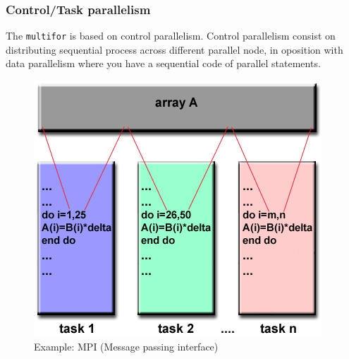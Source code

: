 \documentclass{beamer}
\begin{document}
\begin{frame}
\frametitle{Control/Task parallelism}

The \texttt{multifor} is based on control parallelism. \newline
Control parallelism consist on distributing sequential process across different parallel node, in oposition with data parallelism where you have a sequential code of parallel statements.

\begin{figure}[h]

\centering
\begin{minipage}[t]{0.30\textwidth}

\centering
\includegraphics[width=\textwidth]{pictures/data-parallelism}
 \\
Example: MPI (Message passing interface)
\end{minipage}~%
\begin{minipage}[t]{0.30\textwidth}


\end{minipage}
\end{figure}
\end{frame}
\end{document}
